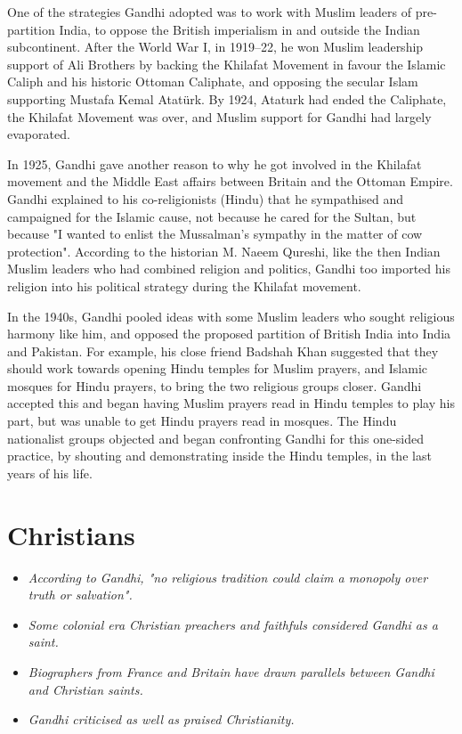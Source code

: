 One of the strategies Gandhi adopted was to work with Muslim leaders of
pre-partition India, to oppose the British imperialism in and outside
the Indian subcontinent. After the World War I, in 1919--22, he won
Muslim leadership support of Ali Brothers by backing the Khilafat
Movement in favour the Islamic Caliph and his historic Ottoman
Caliphate, and opposing the secular Islam supporting Mustafa Kemal
Atatürk. By 1924, Ataturk had ended the Caliphate, the Khilafat Movement
was over, and Muslim support for Gandhi had largely evaporated.

In 1925, Gandhi gave another reason to why he got involved in the
Khilafat movement and the Middle East affairs between Britain and the
Ottoman Empire. Gandhi explained to his co-religionists (Hindu) that he
sympathised and campaigned for the Islamic cause, not because he cared
for the Sultan, but because "I wanted to enlist the Mussalman's sympathy
in the matter of cow protection". According to the historian M. Naeem
Qureshi, like the then Indian Muslim leaders who had combined religion
and politics, Gandhi too imported his religion into his political
strategy during the Khilafat movement.

In the 1940s, Gandhi pooled ideas with some Muslim leaders who sought
religious harmony like him, and opposed the proposed partition of
British India into India and Pakistan. For example, his close friend
Badshah Khan suggested that they should work towards opening Hindu
temples for Muslim prayers, and Islamic mosques for Hindu prayers, to
bring the two religious groups closer. Gandhi accepted this and began
having Muslim prayers read in Hindu temples to play his part, but was
unable to get Hindu prayers read in mosques. The Hindu nationalist
groups objected and began confronting Gandhi for this one-sided
practice, by shouting and demonstrating inside the Hindu temples, in the
last years of his life.

\section{Christians}\label{christians}

\begin{itemize}
\item
  \emph{According to Gandhi, "no religious tradition could claim a
  monopoly over truth or salvation".}
\item
  \emph{Some colonial era Christian preachers and faithfuls considered
  Gandhi as a saint.}
\item
  \emph{Biographers from France and Britain have drawn parallels between
  Gandhi and Christian saints.}
\item
  \emph{Gandhi criticised as well as praised Christianity.}
\end{itemize}

